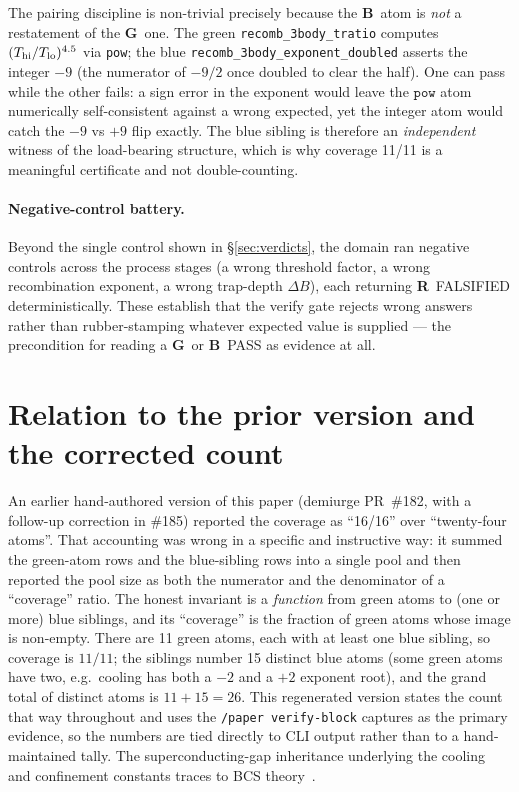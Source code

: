 \documentclass[11pt,a4paper]{article}
\newcommand{\tierBlue}{\textbf{B}}
\newcommand{\tierGreen}{\textbf{G}}
\newcommand{\tierRed}{\textbf{R}}
\begin{document}
The pairing discipline is non-trivial precisely because the \tierBlue\ atom
is \emph{not} a restatement of the \tierGreen\ one. The green
\texttt{recomb\_3body\_tratio} computes $(T_{\rm hi}/T_{\rm lo})^{4.5}$ via
\texttt{pow}; the blue \texttt{recomb\_3body\_exponent\_doubled} asserts the
integer $-9$ (the numerator of $-9/2$ once doubled to clear the half). One
can pass while the other fails: a sign error in the exponent would leave the
$\texttt{pow}$ atom numerically self-consistent against a wrong expected,
yet the integer atom would catch the $-9$ vs $+9$ flip exactly. The blue
sibling is therefore an \emph{independent} witness of the load-bearing
structure, which is why coverage 11/11 is a meaningful certificate and not
double-counting.

\paragraph{Negative-control battery.} Beyond the single control shown in
\S\ref{sec:verdicts}, the domain ran negative controls across the process
stages (a wrong threshold factor, a wrong recombination exponent, a wrong
trap-depth $\Delta B$), each returning \tierRed\ FALSIFIED deterministically.
These establish that the verify gate rejects wrong answers rather than
rubber-stamping whatever expected value is supplied --- the precondition for
reading a \tierGreen\ or \tierBlue\ PASS as evidence at all.

\section{Relation to the prior version and the corrected count}
\label{sec:prior}

An earlier hand-authored version of this paper (demiurge PR~\#182, with a
follow-up correction in \#185) reported the coverage as ``16/16'' over
``twenty-four atoms''. That accounting was wrong in a specific and
instructive way: it summed the green-atom rows and the blue-sibling rows
into a single pool and then reported the pool size as both the numerator and
the denominator of a ``coverage'' ratio. The honest invariant is a
\emph{function} from green atoms to (one or more) blue siblings, and its
``coverage'' is the fraction of green atoms whose image is non-empty. There
are 11 green atoms, each with at least one blue sibling, so coverage is
$11/11$; the siblings number 15 distinct blue atoms (some green atoms have
two, e.g.\ cooling has both a $-2$ and a $+2$ exponent root), and the grand
total of distinct atoms is $11+15=26$. This regenerated version states the
count that way throughout and uses the \texttt{/paper verify-block} captures
as the primary evidence, so the numbers are tied directly to CLI output
rather than to a hand-maintained tally. The superconducting-gap inheritance
underlying the cooling and confinement constants traces to BCS
theory~\citep{Bardeen1957}.
\end{document}
